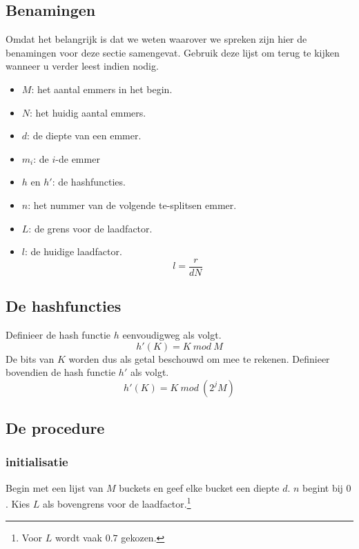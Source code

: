 \documentclass[hashing.tex]{subfiles}
\begin{document}
\subsection{Benamingen}
Omdat het belangrijk is dat we weten waarover we spreken zijn hier de benamingen voor deze sectie samengevat. Gebruik deze lijst om terug te kijken wanneer u verder leest indien nodig.
\begin{itemize}
\item $M$: het aantal emmers in het begin.
\item $N$: het huidig aantal emmers.
\item $d$: de diepte van een emmer.
\item $m_i$: de $i$-de emmer
\item $h$ en $h'$: de hashfuncties.
\item $n$: het nummer van de volgende te-splitsen emmer.
\item $L$: de grens voor de laadfactor.
\item $l$: de huidige laadfactor.
\[
l = \frac{r}{dN}
\]
\end{itemize}

\subsection{De hashfuncties}
Definieer de hash functie $h$ eenvoudigweg als volgt. 
\[
h'(K) = K\ mod\ M
\]
De bits van $K$ worden dus als getal beschouwd om mee te rekenen.
Definieer bovendien de hash functie $h'$ als volgt.
\[
h'(K) = K\ mod\ (2^{j}M)
\]

\subsection{De procedure}
\subsubsection{initialisatie}
Begin met een lijst van $M$ buckets en geef elke bucket een diepte $d$. $n$ begint bij $0$. Kies $L$ als bovengrens voor de laadfactor.\footnote{Voor $L$ wordt vaak $0.7$ gekozen.}
\end{document}
